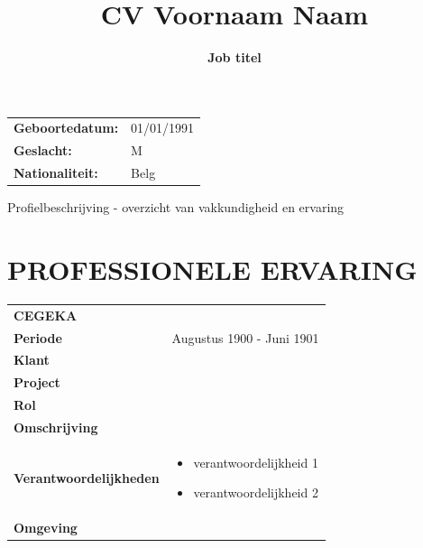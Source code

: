 \documentclass{article}
\title{CV Voornaam Naam}
\subtitle{{\bfseries \color{cegekablue}Job titel}\vspace{-5ex}}
\date{}
\author{}
\begin{document}
\maketitle\thispagestyle{fancy}



\begin{multicols}{2}
	
	\begin{tabular}{ll}
		{\color{cegekablue} \bfseries Geboortedatum:} 	& 01/01/1991 \\
		{\color{cegekablue} \bfseries Geslacht:} 		& M \\
		{\color{cegekablue} \bfseries Nationaliteit:} 	& Belg \\
	\end{tabular}

	\columnbreak

	\begin{flushright}
		Profielbeschrijving - overzicht van vakkundigheid en ervaring
	\end{flushright}

\end{multicols}

\section*{PROFESSIONELE ERVARING}

\begin{tabularx}{\textwidth}{g|X}
	 {\bfseries \leavevmode\color{white} CEGEKA} \\
	
	{\bfseries Periode} 				& Augustus 1900 - Juni 1901 \\
	\hline
	{\bfseries Klant} 					& ~ \\
	\hline
	{\bfseries Project} 				& ~ \\
	\hline
	{\bfseries Rol} 					& ~ \\
	\hline
	{\bfseries Omschrijving} 			& ~ \\
	\hline
	{\bfseries Verantwoordelijkheden} 	
	& 
		\begin{itemize}
			\item verantwoordelijkheid 1
			\item verantwoordelijkheid 2 
		\end{itemize} \\
	\hline
	{\bfseries Omgeving} 				& ~ \\
	\hline
\end{tabularx}
\end{document}
